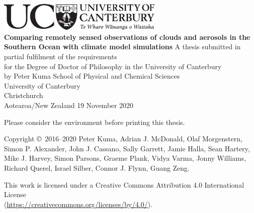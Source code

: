 \thispagestyle{empty}
\begin{center}
\centering
\includegraphics[width=0.6\textwidth]{fig/UCBlack_LAN_Te_Reo.pdf}\\
\vfill
\huge
\sffamily
\textbf{Comparing remotely sensed observations of clouds and
aerosols in the Southern Ocean with climate model
simulations}
\normalfont
\vfill
\Large
A thesis submitted in partial fulfilment of the requirements\\
for the Degree of Doctor of Philosophy
in the University of Canterbury\\
by Peter Kuma
\vfill
School of Physical and Chemical Sciences\\
University of Canterbury\\
Christchurch\\
Aotearoa/New Zealand
\vfill
19 November 2020
\end{center}
\clearpage
\thispagestyle{empty}
\normalfont
\null
\vfill
\noindent
\begin{center}
\large
\noindent
Please consider the environment before printing this thesis.
\end{center}
\vfill
\noindent
Copyright \copyright\ 2016--2020 Peter Kuma,
Adrian J. McDonald, Olaf Morgenstern, Simon P. Alexander, John J. Cassano,
Sally Garrett, Jamie Halla, Sean Hartery, Mike J. Harvey, Simon Parsons,
Graeme Plank, Vidya Varma, Jonny Williams, Richard Querel, Israel Silber, Connor J. Flynn,
Guang Zeng.\\
\par
\noindent
This work is licensed under a Creative Commons Attribution 4.0 International
License\\ (\href{https://creativecommons.org/licenses/by/4.0/}{https://creativecommons.org/licenses/by/4.0/}).
\clearpage
